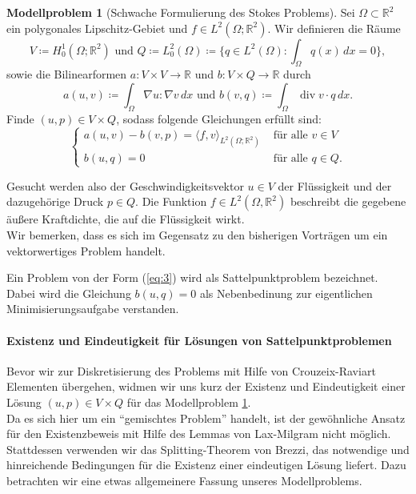 \documentclass[a4paper]{scrartcl}
\newcommand{\real}{\mathbb{R}}
\newcommand{\Hzero}{H_0^1}
\newcommand{\Ltwo}{L^2}
\newcommand{\dx}{\,dx}
\DeclareMathOperator{\divOp}{div}
\theoremstyle{plain}
\theoremstyle{definition}
\newtheorem{modellproblem}{Modellproblem}
\theoremstyle{remark}
\begin{document}
\begin{modellproblem}[Schwache Formulierung des Stokes Problems] \label{problem:1}
  Sei \(\Omega \subset \real^2\) ein polygonales Lipschitz-Gebiet und
  \(f\in \Ltwo(\Omega; \real^2)\). Wir
  definieren die Räume
  \[V \coloneqq \Hzero(\Omega; \real^2) \text{ und } Q \coloneqq
  \Ltwo_0(\Omega) \coloneqq \{q \in \Ltwo(\Omega): \int_\Omega q(x)
  \dx = 0\},\]
  sowie die Bilinearformen \(a \colon V\times V \rightarrow \real\)
  und \(b \colon V\times Q \rightarrow \real\) durch
  \begin{equation}
    \label{eq:2}
    a(u,v) \coloneqq \int_\Omega \nabla u : \nabla v \dx 
    \text{ und }
    b(v,q) \coloneqq \int_\Omega \divOp v \cdot q \dx. 
  \end{equation}
  Finde \((u,p) \in V\times Q\), sodass folgende Gleichungen erfüllt
  sind: 
  \begin{equation}
    \label{eq:3}
    \begin{cases}
      a(u,v) - b(v,p) = \langle f, v \rangle_{\Ltwo(\Omega;\real^2)} &
      \text{ für alle } v \in V \\
      b(u,q) = 0 & \text{ für alle } q \in Q.
    \end{cases}
  \end{equation}
\end{modellproblem}

{\color{blue}
  \noindent Gesucht werden also der Geschwindigkeitsvektor \(u \in V\) der
  Flüssigkeit und der dazugehörige Druck \(p \in Q\). Die Funktion \(f
  \in \Ltwo(\Omega, \real^2)\) beschreibt die gegebene äußere
  Kraftdichte, die auf die Flüssigkeit wirkt. \\
  Wir bemerken, dass es sich im Gegensatz zu den bisherigen Vorträgen um
  ein vektorwertiges Problem handelt. \\
}

\noindent Ein Problem von der Form (\ref{eq:3}) wird als Sattelpunktproblem
bezeichnet. Dabei wird die Gleichung \(b(u,q) = 0 \) als Nebenbedinung
zur eigentlichen Minimi\-sierungs\-aufgabe verstanden. \\ 

\paragraph{Existenz und Eindeutigkeit für Lösungen von Sattelpunktproblemen}
\label{sec:exist-und-eind}

\noindent Bevor wir zur Diskretisierung des Problems mit Hilfe von
Crouzeix-Raviart Elementen übergehen, widmen wir uns kurz der Existenz
und Eindeutigkeit einer Lösung \((u,p) \in V\times Q\) für das Modellproblem
\ref{problem:1}.\\
Da es sich hier um ein ``gemischtes Problem'' handelt, ist der
gewöhnliche Ansatz für den Existenzbeweis mit Hilfe des Lemmas von
Lax-Milgram nicht möglich. Stattdessen verwenden wir das
Splitting-Theorem von Brezzi, das notwendige und hinreichende
Bedingungen für die Existenz einer eindeutigen Lösung liefert. Dazu
betrachten wir eine etwas allgemeinere Fassung unseres Modellproblems.
\end{document}
